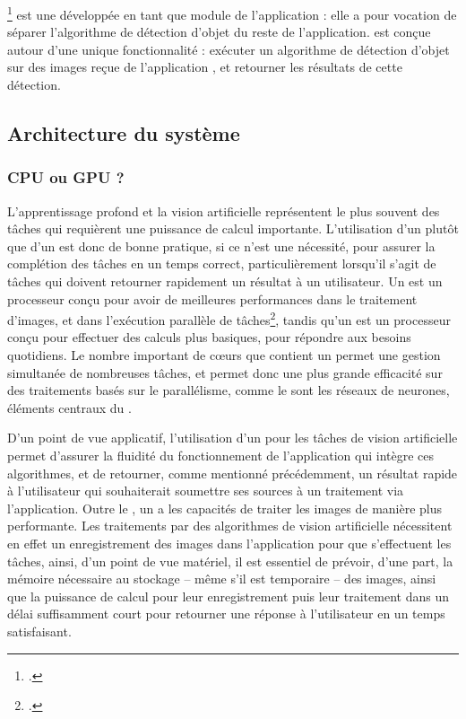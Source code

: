 
\exapi\footcite{norindrElementExtractionGPU2023} est une \api développée en tant que module de l'application \eida : elle a pour vocation de séparer l'algorithme de détection d'objet du reste de l'application. \exapi est conçue autour d'une unique fonctionnalité : exécuter un algorithme de détection d'objet sur des images reçue de l'application \eida, et retourner les résultats de cette détection.

\subsection{Architecture du système}
    \subsubsection{CPU ou GPU ?}
	L'apprentissage profond et la vision artificielle représentent le plus souvent des tâches qui requièrent une puissance de calcul importante. L'utilisation d'un \gpu plutôt que d'un \cpu est donc de bonne pratique, si ce n'est une nécessité, pour assurer la complétion des tâches en un temps correct, particulièrement lorsqu'il s'agit de tâches qui doivent retourner rapidement un résultat à un utilisateur. Un \gpu est un processeur conçu pour avoir de meilleures performances dans le traitement d'images, et dans l'exécution parallèle de tâches\footcite{sharabokWhyDeepLearning2020}, tandis qu'un \cpu est un processeur conçu pour effectuer des calculs plus basiques, pour répondre aux besoins quotidiens. Le nombre important de cœurs que contient un \gpu permet une gestion simultanée de nombreuses tâches, et permet donc une plus grande efficacité sur des traitements basés sur le parallélisme, comme le sont les réseaux de neurones, éléments centraux du \dl.
	
	D'un point de vue applicatif, l'utilisation d'un \gpu pour les tâches de vision artificielle permet d'assurer la fluidité du fonctionnement de l'application qui intègre ces algorithmes, et de retourner, comme mentionné précédemment, un résultat rapide à l'utilisateur qui souhaiterait soumettre ses sources à un traitement via l'application. Outre le \ml, un \gpu a les capacités de traiter les images de manière plus performante. Les traitements par des algorithmes de vision artificielle nécessitent en effet un enregistrement des images dans l'application pour que s'effectuent les tâches, ainsi, d'un point de vue matériel, il est essentiel de prévoir, d'une part, la mémoire nécessaire au stockage -- même s'il est temporaire -- des images, ainsi que la puissance de calcul pour leur enregistrement puis leur traitement dans un délai suffisamment court pour retourner une réponse à l'utilisateur en un temps satisfaisant. 
    
